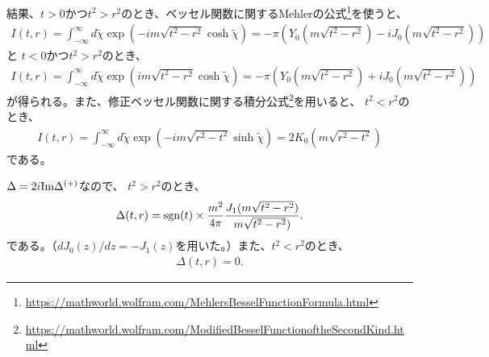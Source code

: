 \documentclass[10pt,a4paper]{jarticle}
\begin{document}
結果、$t>0$かつ$t^2>r^2$のとき、ベッセル関数に関するMehlerの公式\footnote{\url{https://mathworld.wolfram.com/MehlersBesselFunctionFormula.html}}を使うと、
\begin{align}
I(t,r) = \int_{-\infty}^\infty d\tilde\chi \exp\left( -im\sqrt{t^2-r^2} \cosh \tilde\chi \right)
= -\pi ( Y_0(m\sqrt{t^2-r^2})-iJ_0(m\sqrt{t^2-r^2}) )
\end{align}
と
$t<0$かつ$t^2>r^2$のとき、
\begin{align}
I(t,r) = \int_{-\infty}^\infty d\tilde\chi \exp\left( im\sqrt{t^2-r^2} \cosh \tilde\chi \right)
= -\pi ( Y_0(m\sqrt{t^2-r^2})+iJ_0(m\sqrt{t^2-r^2}) )
\end{align}
が得られる。また、修正ベッセル関数に関する積分公式\footnote{\url{https://mathworld.wolfram.com/ModifiedBesselFunctionoftheSecondKind.html}}を用いると、
$t^2<r^2$のとき、
\begin{align}
I(t,r) = \int_{-\infty}^\infty d\tilde\chi \exp\left( -im\sqrt{r^2-t^2} \sinh \tilde\chi \right)
= 2 K_0(m\sqrt{r^2-t^2})
\end{align}
である。

$\Delta = 2i{\rm Im}\Delta^{(+)}$なので、
$t^2 > r^2$のとき、
\begin{align}
\Delta(t,r) = {\rm sgn}(t) \times \frac{m^2}{4\pi} \frac{J_1(m\sqrt{t^2-r^2})}{m\sqrt{t^2-r^2})}.
\end{align}
である。（$dJ_0(z)/dz = -J_1(z)$を用いた。）また、$t^2 < r^2$のとき、
\begin{align}
\Delta(t,r) = 0.
\end{align}
\end{document}
